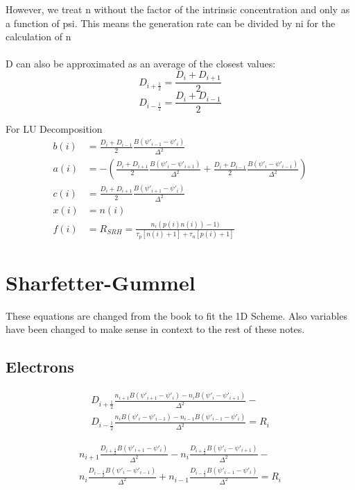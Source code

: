 \documentclass[12pt]{article}
\begin{document}
However, we treat n without the factor of the intrinsic concentration and only as a function of psi. This means the generation rate can be divided by ni for the calculation of n
\\
\\
D can also be approximated as an average of the closest values:
\begin{equation}
D_{i+\frac{1}{2}}=\frac{D_{i}+D_{i+1}}{2}
\label{eqn:DiffusionAvgEq+}
\end{equation}
\begin{equation}
D_{i-\frac{1}{2}}=\frac{D_{i}+D_{i-1}}{2}
\label{eqn:DiffusionAvgEq-}
\end{equation}


For LU Decomposition
\begin{align}
b(i)&=\frac{D_{i}+D_{i-1}}{2}\frac{B(\psi'_{i-1}-\psi'_{i})}{{\Delta^{2}}}
\\
a(i)&=
-(\frac{D_{i}+D_{i+1}}{2}\frac{
	B(\psi'_{i}-\psi'_{i+1})}{{\Delta^{2}}}
+\frac{D_{i}+D_{i-1}}{2}\frac{
	B(\psi'_{i}-\psi'_{i-1})}{{\Delta^{2}}})
\\
c(i)&=\frac{D_{i}+D_{i+1}}{2}\frac{B(\psi'_{i+1}-\psi'_{i})}{{\Delta^{2}}}
\\
x(i)&=n(i)
\\
f(i)&=R_{SRH}=
\frac
{n_{i}(p(i)n(i))-1)}
{\tau_{p}[n(i)+1]+
	\tau_{n}[p(i)+1]}
\end{align}

\section{Sharfetter-Gummel \cite[p.158-159] {Selberherr1984}}
These equations are changed from the book to fit the 1D Scheme. Also variables have been changed to make sense in context to the rest of these notes.
\subsection{Electrons}
\begin{multline}
D_{i+\frac{1}{2}}
\frac
{n_{i+1}B(\psi'_{i+1}-\psi'_{i})-n_{i}B(\psi'_{i}-\psi'_{i+1})}
{\Delta^{2}}-
\\
D_{i-\frac{1}{2}}
\frac
{n_{i}B(\psi'_{i}-\psi'_{i-1})-n_{i-1}B(\psi'_{i-1}-\psi'_{i})}
{\Delta^{2}}=
R_{i}
\end{multline}

\begin{multline}
n_{i+1}
\frac
{D_{i+\frac{1}{2}}B(\psi'_{i+1}-\psi'_{i})}
{\Delta^{2}}-
n_{i}
\frac{D_{i+\frac{1}{2}}B(\psi'_{i}-\psi'_{i+1})}
{\Delta^{2}}-
\\
n_{i}
\frac
{D_{i-\frac{1}{2}}B(\psi'_{i}-\psi'_{i-1})}
{\Delta^{2}}+
n_{i-1}	
\frac
{D_{i-\frac{1}{2}}B(\psi'_{i-1}-\psi'_{i})}
{\Delta^{2}}=
R_{i}
\end{multline}
\end{document}
